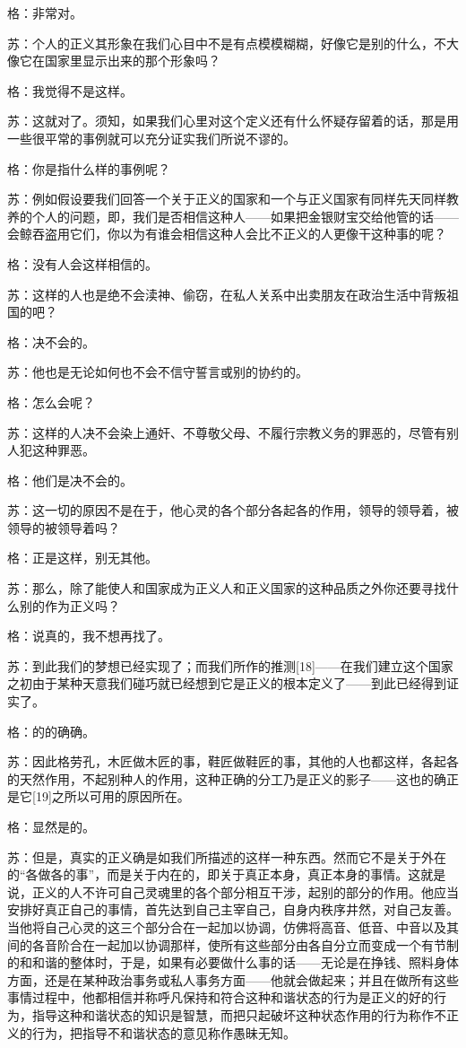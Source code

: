 \documentclass[12pt,oneside]{book}
\begin{document}
格：非常对。

苏：个人的正义其形象在我们心目中不是有点模模糊糊，好像它是别的什么，不大像它在国家里显示出来的那个形象吗？

格：我觉得不是这样。

苏：这就对了。须知，如果我们心里对这个定义还有什么怀疑存留着的话，那是用一些很平常的事例就可以充分证实我们所说不谬的。

格：你是指什么样的事例呢？

苏：例如假设要我们回答一个关于正义的国家和一个与正义国家有同样先天同样教养的个人的问题，即，我们是否相信这种人——如果把金银财宝交给他管的话——会鲸吞盗用它们，你以为有谁会相信这种人会比不正义的人更像干这种事的呢？

格：没有人会这样相信的。

苏：这样的人也是绝不会渎神、偷窃，在私人关系中出卖朋友在政治生活中背叛祖国的吧？

格：决不会的。

苏：他也是无论如何也不会不信守誓言或别的协约的。

格：怎么会呢？

苏：这样的人决不会染上通奸、不尊敬父母、不履行宗教义务的罪恶的，尽管有别人犯这种罪恶。

格：他们是决不会的。

苏：这一切的原因不是在于，他心灵的各个部分各起各的作用，领导的领导着，被领导的被领导着吗？

格：正是这样，别无其他。

苏：那么，除了能使人和国家成为正义人和正义国家的这种品质之外你还要寻找什么别的作为正义吗？

格：说真的，我不想再找了。

苏：到此我们的梦想已经实现了；而我们所作的推测[18]——在我们建立这个国家之初由于某种天意我们碰巧就已经想到它是正义的根本定义了——到此已经得到证实了。

格：的的确确。

苏：因此格劳孔，木匠做木匠的事，鞋匠做鞋匠的事，其他的人也都这样，各起各的天然作用，不起别种人的作用，这种正确的分工乃是正义的影子——这也的确正是它[19]之所以可用的原因所在。

格：显然是的。

苏：但是，真实的正义确是如我们所描述的这样一种东西。然而它不是关于外在的“各做各的事”，而是关于内在的，即关于真正本身，真正本身的事情。这就是说，正义的人不许可自己灵魂里的各个部分相互干涉，起别的部分的作用。他应当安排好真正自己的事情，首先达到自己主宰自己，自身内秩序井然，对自己友善。当他将自己心灵的这三个部分合在一起加以协调，仿佛将高音、低音、中音以及其间的各音阶合在一起加以协调那样，使所有这些部分由各自分立而变成一个有节制的和和谐的整体时，于是，如果有必要做什么事的话——无论是在挣钱、照料身体方面，还是在某种政治事务或私人事务方面——他就会做起来；并且在做所有这些事情过程中，他都相信并称呼凡保持和符合这种和谐状态的行为是正义的好的行为，指导这种和谐状态的知识是智慧，而把只起破坏这种状态作用的行为称作不正义的行为，把指导不和谐状态的意见称作愚昧无知。
\end{document}
